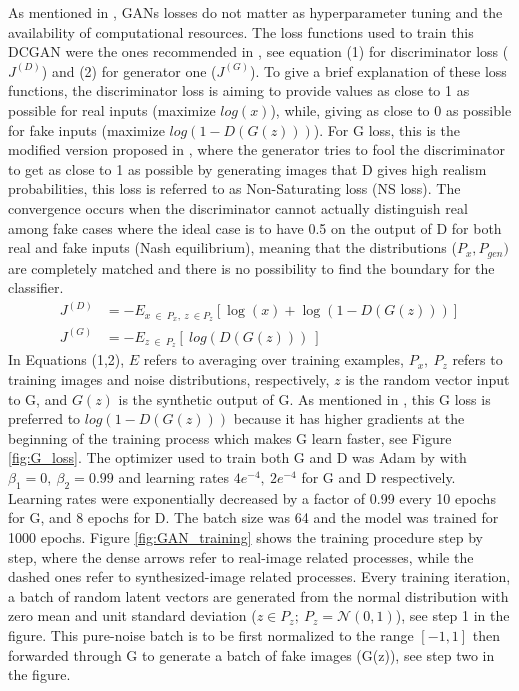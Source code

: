 \documentclass[final,3p,twocolumn,authoryear,sort&compress,times]{maia}
\begin{document}
As mentioned in \citet{are_GANs_different}, GANs losses do not matter as hyperparameter tuning and the availability of computational resources.
The loss functions used to train this DCGAN were the ones recommended in \citet{GAN}, see equation (1) for discriminator loss ($J^{(D)}$) and (2) for generator one ($J^{(G)}$). To give a brief explanation of these loss functions, the discriminator loss is aiming to provide values as close to 1 as possible for real inputs (maximize $log(x)$), while, giving as close to 0 as possible for fake inputs (maximize $log(1-D(G(z)))$).
For G loss, this is the modified version proposed in \citet{GAN}, where the generator tries to fool the discriminator to get as close to 1 as possible by generating images that D gives high realism probabilities, this loss is referred to as Non-Saturating loss (NS loss). The convergence occurs when the discriminator cannot actually distinguish real among fake cases where the ideal case is to have 0.5 on the output of D for both real and fake inputs (Nash equilibrium), meaning that the distributions ($P_{x}, P_{gen})$ are completely matched and there is no possibility to find the boundary for the classifier.
\begin{align}
{J}^{(D)}&=  -E_{x\ \in\ P_x,\ z\ \in P_z}[\log(x) + \log(1-D(G(z)))] \\
{J}^{(G)}&= -E_{z\ \in\ P_z}[\ log(D(G(z)))\ ]
\end{align}
In Equations (1,2), $E$ refers to averaging over training examples, $P_x,\ P_z$ refers to training images and noise distributions, respectively, $z$ is the random vector input to G, and $G(z)$ is the synthetic output of G.
As mentioned in \citet{GAN}, this G loss is preferred to $log(1-D(G(z)))$ because it has higher gradients at the beginning of the training process which makes G learn faster, see Figure \ref{fig:G_loss}. The optimizer used to train both G and D was Adam by \citet{adam} with $\beta_1=0,\ \beta_2=0.99$ and learning rates $4e^{-4}, \ 2e^{-4}$ for G and D respectively. Learning rates were exponentially decreased by a factor of 0.99 every 10 epochs for G, and 8 epochs for D. The batch size was 64 and the model was trained for 1000 epochs. Figure \ref{fig:GAN_training} shows the training procedure step by step, where the dense arrows refer to real-image related processes, while the dashed ones refer to synthesized-image related processes. Every training iteration, a batch of random latent vectors are generated from the normal distribution with zero mean and unit standard deviation ($z\in P_z;\ P_z=\mathcal{N}(0,1)$), see step 1 in the figure. This pure-noise batch is to be first normalized to the range $[-1,1]$ then forwarded through G to generate a batch of fake images (G(z)), see step two in the figure.
\end{document}
